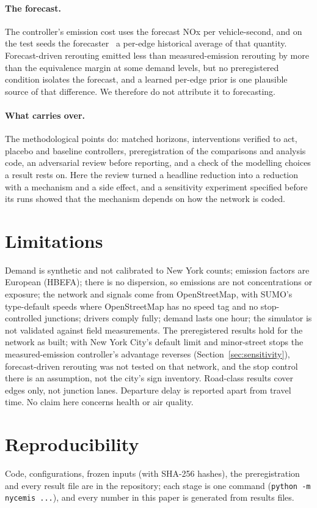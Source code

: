 \documentclass[11pt]{article}
\begin{document}
\paragraph{The forecast.} The controller's emission cost uses the forecast NOx per vehicle-second, and on the test
seeds the forecaster \ForecastVerdictR\ a per-edge historical average of that quantity. Forecast-driven rerouting
emitted less than measured-emission rerouting by more than the equivalence margin at some demand levels, but no
preregistered condition isolates the forecast, and a learned per-edge prior is one plausible source of that
difference. We therefore do not attribute it to forecasting.

\paragraph{What carries over.} The methodological points do: matched horizons, interventions verified to act,
placebo and baseline controllers, preregistration of the comparisons and analysis code, an adversarial review
before reporting, and a check of the modelling choices a result rests on. Here the review turned a headline
reduction into a reduction with a mechanism and a side effect, and a sensitivity experiment specified before its runs
showed that the mechanism depends on how the network is coded.

\section{Limitations}
Demand is synthetic and not calibrated to New York counts; emission factors are European (HBEFA); there is no
dispersion, so emissions are not concentrations or exposure; the network and signals come from OpenStreetMap, with
SUMO's type-default speeds where OpenStreetMap has no speed tag and no stop-controlled junctions; drivers comply
fully; demand lasts one hour; the simulator is not validated against field measurements. The preregistered results
hold for the network as built; with New York City's default limit and minor-street stops the measured-emission
controller's advantage reverses (Section~\ref{sec:sensitivity}), forecast-driven rerouting was not tested on that
network, and the stop control there is an assumption, not the city's sign inventory. Road-class results cover edges
only, not junction lanes. Departure delay is reported apart from travel time. No claim here concerns health or air
quality.

\section{Reproducibility}
Code, configurations, frozen inputs (with SHA-256 hashes), the preregistration and every result file are in the
repository; each stage is one command (\texttt{python -m nycemis ...}), and every number in this paper is
generated from results files.
\end{document}
